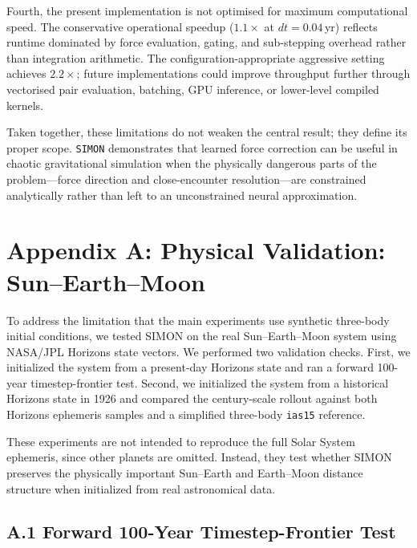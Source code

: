 \documentclass[12pt]{article}
\begin{document}
Fourth, the present implementation is not optimised for maximum computational
speed. The conservative operational speedup ($1.1\times$ at $dt=0.04$\,yr)
reflects runtime dominated by force evaluation, gating, and sub-stepping
overhead rather than integration arithmetic. The configuration-appropriate
aggressive setting achieves $2.2\times$; future implementations could improve
throughput further through vectorised pair evaluation, batching, GPU inference,
or lower-level compiled kernels.

Taken together, these limitations do not weaken the central result; they define its proper
scope. \texttt{SIMON} demonstrates that learned force correction can be useful in chaotic
gravitational simulation when the physically dangerous parts of the problem---force
direction and close-encounter resolution---are constrained analytically rather than left
to an unconstrained neural approximation.


\clearpage
{}
\section*{Appendix A: Physical Validation: Sun--Earth--Moon}
\label{app:real_system_validation}

To address the limitation that the main experiments use synthetic three-body initial
conditions, we tested SIMON on the real Sun--Earth--Moon system using NASA/JPL
Horizons state vectors. We performed two validation checks. First, we initialized the
system from a present-day Horizons state and ran a forward 100-year timestep-frontier
test. Second, we initialized the system from a historical Horizons state in 1926 and
compared the century-scale rollout against both Horizons ephemeris samples and a
simplified three-body \texttt{ias15} reference.

These experiments are not intended to reproduce the full Solar System ephemeris, since
other planets are omitted. Instead, they test whether SIMON preserves the physically
important Sun--Earth and Earth--Moon distance structure when initialized from real
astronomical data.

\subsection*{A.1 Forward 100-Year Timestep-Frontier Test}
\end{document}
